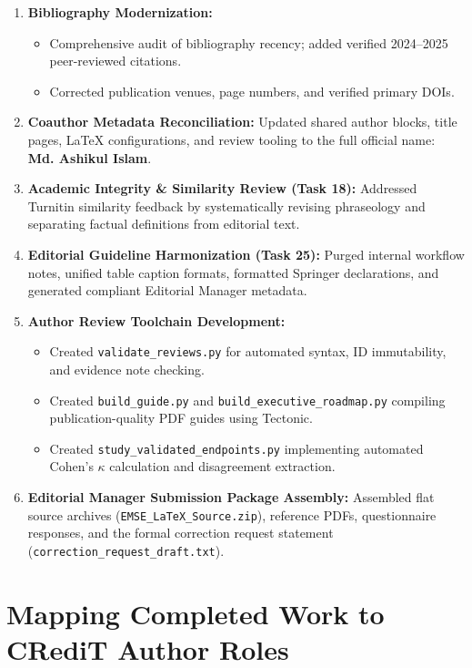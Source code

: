 \documentclass[11pt,a4paper]{article}
\begin{document}
\begin{enumerate}
  \item \textbf{Bibliography Modernization:}
  \begin{itemize}
    \item Comprehensive audit of bibliography recency; added verified 2024--2025 peer-reviewed citations.
    \item Corrected publication venues, page numbers, and verified primary DOIs.
  \end{itemize}
  \item \textbf{Coauthor Metadata Reconciliation:}
    Updated shared author blocks, title pages, LaTeX configurations, and review tooling to the full official name: \textbf{Md. Ashikul Islam}.
  \item \textbf{Academic Integrity \& Similarity Review (Task 18):}
    Addressed Turnitin similarity feedback by systematically revising phraseology and separating factual definitions from editorial text.
  \item \textbf{Editorial Guideline Harmonization (Task 25):}
    Purged internal workflow notes, unified table caption formats, formatted Springer declarations, and generated compliant Editorial Manager metadata.
  \item \textbf{Author Review Toolchain Development:}
  \begin{itemize}
    \item Created \nolinkurl{validate_reviews.py} for automated syntax, ID immutability, and evidence note checking.
    \item Created \nolinkurl{build_guide.py} and \nolinkurl{build_executive_roadmap.py} compiling publication-quality PDF guides using Tectonic.
    \item Created \nolinkurl{study_validated_endpoints.py} implementing automated Cohen's $\kappa$ calculation and disagreement extraction.
  \end{itemize}
  \item \textbf{Editorial Manager Submission Package Assembly:}
    Assembled flat source archives (\nolinkurl{EMSE_LaTeX_Source.zip}), reference PDFs, questionnaire responses, and the formal correction request statement (\nolinkurl{correction_request_draft.txt}).
\end{enumerate}

\section{Mapping Completed Work to CRediT Author Roles}
\end{document}
